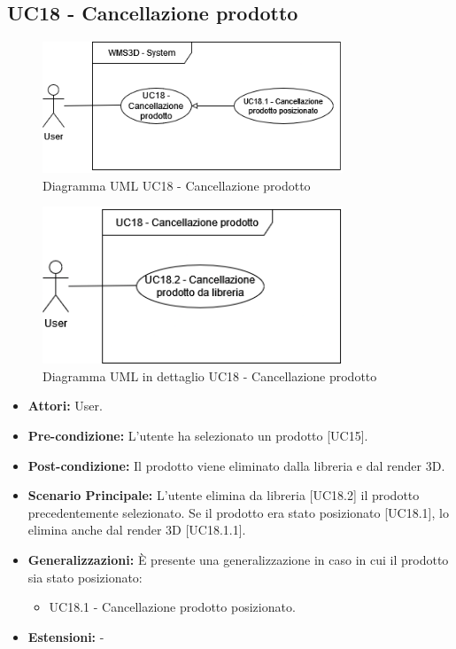 \subsection{UC18 - Cancellazione prodotto}
\begin{figure}[H]
  \centering
  \includegraphics[width=0.8\textwidth]{UC_diagrams_11-20/UC18_sys.drawio.png}
   \caption{Diagramma UML UC18 - Cancellazione prodotto}
\end{figure}
\begin{figure}[H]
  \centering
  \includegraphics[width=0.8\textwidth]{UC_diagrams_11-20/UC18.drawio.png}
   \caption{Diagramma UML in dettaglio UC18 - Cancellazione prodotto}
\end{figure}
\begin{itemize}
    \item \textbf{Attori:} User.
    \item \textbf{Pre-condizione:} L'utente ha selezionato un prodotto [UC15].
    \item \textbf{Post-condizione:} Il prodotto viene eliminato dalla libreria e dal render 3D.
    \item \textbf{Scenario Principale:} L'utente elimina da libreria [UC18.2] il prodotto precedentemente selezionato. Se il prodotto era stato posizionato [UC18.1], lo elimina anche dal render 3D [UC18.1.1].
    \item \textbf{Generalizzazioni:} È presente una generalizzazione in caso in cui il prodotto sia stato posizionato:
    \begin{itemize}
        \item UC18.1 - Cancellazione prodotto posizionato.
    \end{itemize}
    \item \textbf{Estensioni:} -
\end{itemize}


